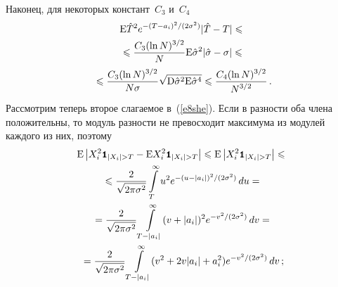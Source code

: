 \begin{multicols}{2}
Наконец, для некоторых констант~$C_3$ и~$C_4$
\begin{multline}
\mbox{E}\hat{T}^2 e^{-{(T-a_i)^2}/(2\sigma^2)}|\hat{T}-T|\leqslant{}\\
{}\leqslant\displaystyle\frac{\displaystyle C_3(\ln N)^{3/2}\mathstrut}{\displaystyle N\mathstrut}\mbox{E}\hat{\sigma}^2|\hat{\sigma}-\sigma|\leqslant{}\\
{}\leqslant \displaystyle\frac{\displaystyle C_3(\ln N)^{3/2}\mathstrut}{\displaystyle N\sigma\mathstrut}\sqrt{\mbox{D}\hat{\sigma}^2\mbox{E}\hat{\sigma}^4}\leqslant
\displaystyle\frac{\displaystyle C_4(\ln N)^{3/2}\mathstrut}{\displaystyle N^{3/2}\mathstrut}\,.
\label{e11she}
\end{multline}
Рассмотрим теперь второе слагаемое в~(\ref{e8she}). Если в разности оба члена положительны, 
то модуль раз\-ности не превосходит максимума из модулей каж\-до\-го из них, поэтому
\begin{multline*}
\mbox{E}\left\vert X_i^2\Ik_{|X_i|> T}-\mbox{E}X_i^2\Ik_{|X_i|> T}\right\vert\leqslant\mbox{E}
\left\vert X_i^2\Ik_{|X_i|> T}\right\vert\leqslant{}\\
{}\leqslant\fr{2}{\sqrt{2\pi\sigma^2}}\int\limits_{T}^{\infty}u^2e^{-{(u-|a_i|)^2}/(2\sigma^2)}\,du={}\\
{}=\fr{2}{\sqrt{2\pi\sigma^2}}\int\limits_{T-|a_i|}^{\infty}(v+|a_i|)^2e^{-{v^2}/(2\sigma^2)}\,dv={}\\
{}=
\fr{2}{\sqrt{2\pi\sigma^2}}\int\limits_{T-|a_i|}^{\infty}(v^2+2v|a_i|+a_i^2)e^{-{v^2}/(2\sigma^2)}\,dv\,;
\end{multline*}

\vspace*{-12pt}


\end{multicols}
